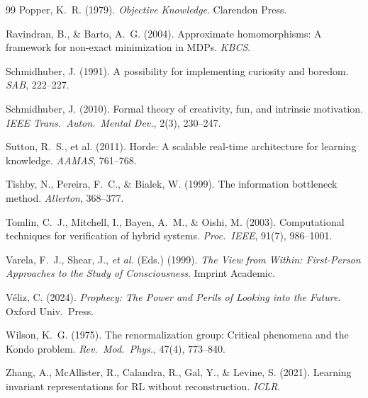 \documentclass[10pt,twocolumn]{article}
\theoremstyle{plain}
\theoremstyle{definition}
\theoremstyle{remark}
\begin{document}
\begin{thebibliography}{99}
Popper, K.~R. (1979).
\textit{Objective Knowledge}.
Clarendon Press.

Ravindran, B., \& Barto, A.~G. (2004).
Approximate homomorphisms: A framework for non-exact minimization in MDPs.
\textit{KBCS}.

Schmidhuber, J. (1991).
A possibility for implementing curiosity and boredom.
\textit{SAB}, 222--227.

Schmidhuber, J. (2010).
Formal theory of creativity, fun, and intrinsic motivation.
\textit{IEEE Trans.\ Auton.\ Mental Dev.}, 2(3), 230--247.

Sutton, R.~S., et al. (2011).
Horde: A scalable real-time architecture for learning knowledge.
\textit{AAMAS}, 761--768.

Tishby, N., Pereira, F.~C., \& Bialek, W. (1999).
The information bottleneck method.
\textit{Allerton}, 368--377.

Tomlin, C.~J., Mitchell, I., Bayen, A.~M., \& Oishi, M. (2003).
Computational techniques for verification of hybrid systems.
\textit{Proc.\ IEEE}, 91(7), 986--1001.

Varela, F.~J., Shear, J., \emph{et al.} (Eds.) (1999).
\textit{The View from Within: First-Person Approaches to the Study of Consciousness}.
Imprint Academic.

V\'eliz, C. (2024).
\textit{Prophecy: The Power and Perils of Looking into the Future}.
Oxford Univ.\ Press.

Wilson, K.~G. (1975).
The renormalization group: Critical phenomena and the Kondo problem.
\textit{Rev.\ Mod.\ Phys.}, 47(4), 773--840.

Zhang, A., McAllister, R., Calandra, R., Gal, Y., \& Levine, S. (2021).
Learning invariant representations for RL without reconstruction.
\textit{ICLR}.

\end{thebibliography}
\end{document}
